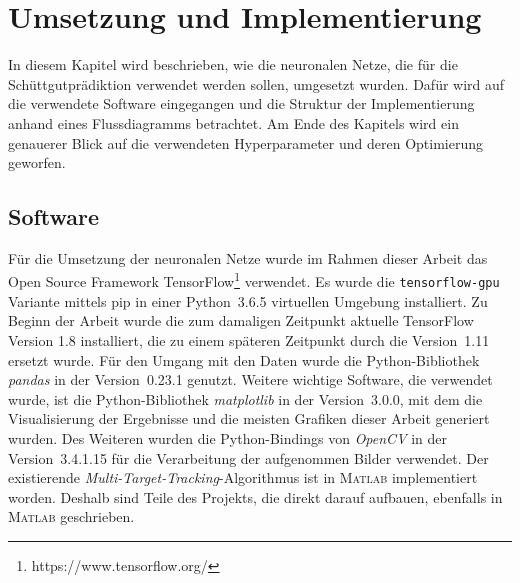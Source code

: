 \chapter{Umsetzung und Implementierung}

In diesem Kapitel wird beschrieben, wie die neuronalen Netze, die für die Schüttgut\-prädiktion verwendet werden sollen,
umgesetzt wurden.
Dafür wird auf die verwendete Software eingegangen und die Struktur der Implementierung anhand eines Flussdiagramms betrachtet.
Am Ende des Kapitels wird ein genauerer Blick auf die verwendeten Hyperparameter und deren Optimierung geworfen.



\section{Software}


Für die Umsetzung der neuronalen Netze wurde im Rahmen dieser Arbeit 
das Open Source Framework TensorFlow\footnote{https://www.tensorflow.org/} verwendet.
Es wurde die \texttt{tensorflow-gpu} Variante mittels pip in einer Python~3.6.5 virtuellen Umgebung installiert.
Zu Beginn der Arbeit wurde die zum damaligen Zeitpunkt aktuelle TensorFlow Version 1.8 installiert, die zu einem späteren Zeitpunkt durch die Version~1.11 ersetzt wurde.
Für den Umgang mit den Daten wurde die Python-Bibliothek \textit{pandas} in der Version~0.23.1 genutzt.
Weitere wichtige Software, die verwendet wurde,
ist die Python-Bibliothek \textit{matplotlib} in der Version~3.0.0, mit dem die Visualisierung der Ergebnisse und die meisten Grafiken dieser Arbeit generiert wurden.
Des Weiteren wurden die Python-Bindings von \textit{OpenCV} in der Version~3.4.1.15 für die Verarbeitung der aufgenommen Bilder verwendet.
Der existierende \textit{Multi-Target-Tracking}-Algorithmus ist in \textsc{Matlab} implementiert worden. 
Deshalb sind Teile des Projekts, die direkt darauf aufbauen, ebenfalls in \textsc{Matlab} geschrieben.


